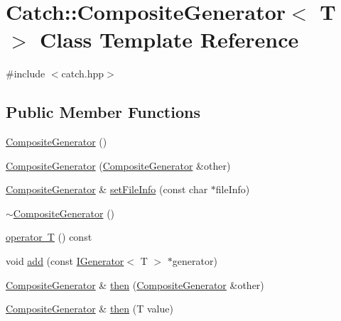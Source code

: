 \hypertarget{class_catch_1_1_composite_generator}{}\section{Catch\+:\+:Composite\+Generator$<$ T $>$ Class Template Reference}
\label{class_catch_1_1_composite_generator}


{\ttfamily \#include $<$catch.\+hpp$>$}

\subsection*{Public Member Functions}
\begin{DoxyCompactItemize}
\item 
\mbox{\hyperlink{class_catch_1_1_composite_generator_a923398b140371d1783858766864a1af5}{Composite\+Generator}} ()
\item 
\mbox{\hyperlink{class_catch_1_1_composite_generator_a21a7070a00e4a6fe021294c356692692}{Composite\+Generator}} (\mbox{\hyperlink{class_catch_1_1_composite_generator}{Composite\+Generator}} \&other)
\item 
\mbox{\hyperlink{class_catch_1_1_composite_generator}{Composite\+Generator}} \& \mbox{\hyperlink{class_catch_1_1_composite_generator_ac3c57cf4ca5472f440bf71e2936bcd4a}{set\+File\+Info}} (const char $\ast$file\+Info)
\item 
\mbox{\hyperlink{class_catch_1_1_composite_generator_a5766205abd7004c508c20ddbb5e5555e}{$\sim$\+Composite\+Generator}} ()
\item 
\mbox{\hyperlink{class_catch_1_1_composite_generator_a83d6c941e2e735b9528e6e832f7b76e7}{operator T}} () const
\item 
void \mbox{\hyperlink{class_catch_1_1_composite_generator_af3774d42ad2d3453d089ca599efe0517}{add}} (const \mbox{\hyperlink{struct_catch_1_1_i_generator}{I\+Generator}}$<$ T $>$ $\ast$generator)
\item 
\mbox{\hyperlink{class_catch_1_1_composite_generator}{Composite\+Generator}} \& \mbox{\hyperlink{class_catch_1_1_composite_generator_a2e03f42df85cdd238aabd77a80b075d5}{then}} (\mbox{\hyperlink{class_catch_1_1_composite_generator}{Composite\+Generator}} \&other)
\item 
\mbox{\hyperlink{class_catch_1_1_composite_generator}{Composite\+Generator}} \& \mbox{\hyperlink{class_catch_1_1_composite_generator_aefdc11bcfccdf07d2db5f0da3ed8758c}{then}} (T value)
\end{DoxyCompactItemize}



